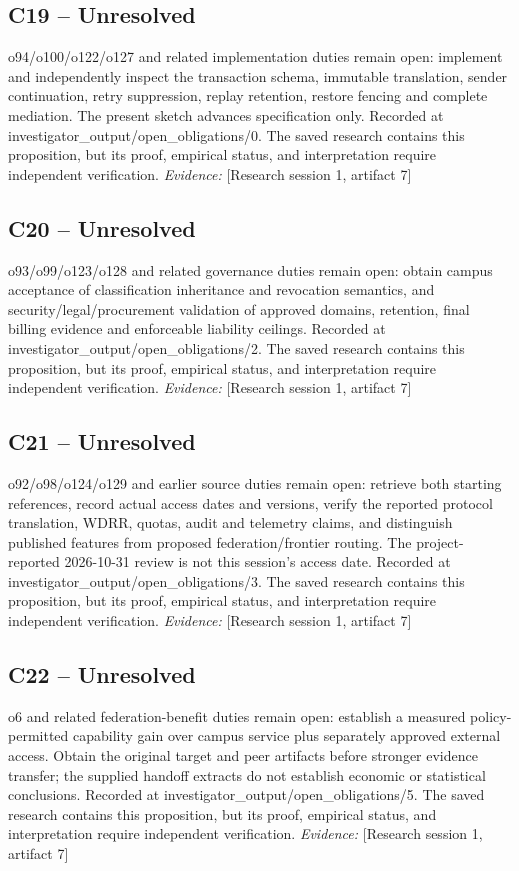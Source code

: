 \documentclass[11pt]{article}
\begin{document}
\subsection{C19 -- Unresolved}
o94/o100/o122/o127 and related implementation duties remain open: implement and independently inspect the transaction schema, immutable translation, sender continuation, retry suppression, replay retention, restore fencing and complete mediation. The present sketch advances specification only.
Recorded at investigator\_output/open\_obligations/0. The saved research contains this proposition, but its proof, empirical status, and interpretation require independent verification.
\textit{Evidence: }[Research session 1, artifact 7]
\subsection{C20 -- Unresolved}
o93/o99/o123/o128 and related governance duties remain open: obtain campus acceptance of classification inheritance and revocation semantics, and security/legal/procurement validation of approved domains, retention, final billing evidence and enforceable liability ceilings.
Recorded at investigator\_output/open\_obligations/2. The saved research contains this proposition, but its proof, empirical status, and interpretation require independent verification.
\textit{Evidence: }[Research session 1, artifact 7]
\subsection{C21 -- Unresolved}
o92/o98/o124/o129 and earlier source duties remain open: retrieve both starting references, record actual access dates and versions, verify the reported protocol translation, WDRR, quotas, audit and telemetry claims, and distinguish published features from proposed federation/frontier routing. The project-reported 2026-10-31 review is not this session's access date.
Recorded at investigator\_output/open\_obligations/3. The saved research contains this proposition, but its proof, empirical status, and interpretation require independent verification.
\textit{Evidence: }[Research session 1, artifact 7]
\subsection{C22 -- Unresolved}
o6 and related federation-benefit duties remain open: establish a measured policy-permitted capability gain over campus service plus separately approved external access. Obtain the original target and peer artifacts before stronger evidence transfer; the supplied handoff extracts do not establish economic or statistical conclusions.
Recorded at investigator\_output/open\_obligations/5. The saved research contains this proposition, but its proof, empirical status, and interpretation require independent verification.
\textit{Evidence: }[Research session 1, artifact 7]
\end{document}
